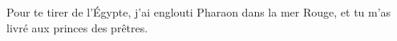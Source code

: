 Pour te tirer de l’Égypte, j’ai englouti Pharaon dans la mer Rouge, et tu m’as livré aux princes des prêtres.
